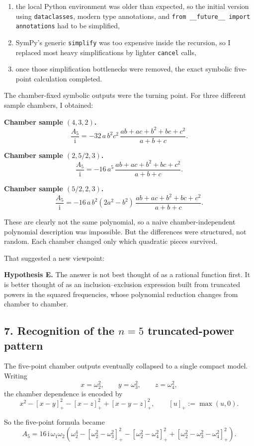 \documentclass[11pt]{article}
\newcommand{\pp}[1]{\left[#1\right]_+}
\newcommand{\ii}{\mathrm{i}}
\begin{document}
\begin{enumerate}
\item the local Python environment was older than expected, so the initial
version using \texttt{dataclasses}, modern type annotations, and
\texttt{from \_\_future\_\_ import annotations} had to be simplified,
\item SymPy's generic \texttt{simplify} was too expensive inside the recursion,
so I replaced most heavy simplifications by lighter \texttt{cancel} calls,
\item once those simplification bottlenecks were removed, the exact symbolic
five-point calculation completed.
\end{enumerate}

The chamber-fixed symbolic outputs were the turning point. For three different
sample chambers, I obtained:

\textbf{Chamber sample $(4,3,2)$.}
\[
\frac{A_5}{\ii}
=
-32\,a\,b^2 c^2\,
\frac{ab+ac+b^2+bc+c^2}{a+b+c}.
\]

\textbf{Chamber sample $(2,5/2,3)$.}
\[
\frac{A_5}{\ii}
=
-16\,a^5\,
\frac{ab+ac+b^2+bc+c^2}{a+b+c}.
\]

\textbf{Chamber sample $(5/2,2,3)$.}
\[
\frac{A_5}{\ii}
=
-16\,a\,b^2(2a^2-b^2)\,
\frac{ab+ac+b^2+bc+c^2}{a+b+c}.
\]

These are clearly not the same polynomial, so a naive chamber-independent
polynomial description was impossible. But the differences were structured, not
random. Each chamber changed only which quadratic pieces survived.

That suggested a new viewpoint:

\medskip
\textbf{Hypothesis E.} The answer is not best thought of as a rational function
first. It is better thought of as an inclusion--exclusion expression built from
truncated powers in the squared frequencies, whose polynomial reduction changes
from chamber to chamber.
\medskip

\subsection*{7. Recognition of the $n=5$ truncated-power pattern}

The five-point chamber outputs eventually collapsed to a single compact model.
Writing
\[
x=\omega_2^2,\qquad y=\omega_3^2,\qquad z=\omega_4^2,
\]
the chamber dependence is encoded by
\[
x^2-\pp{x-y}^2-\pp{x-z}^2+\pp{x-y-z}^2,
\qquad \pp{u}:=\max(u,0).
\]

So the five-point formula became
\[
A_5
=
16\,\ii\,\omega_1\omega_2
\left(
\omega_2^4
-\pp{\omega_2^2-\omega_3^2}^2
-\pp{\omega_2^2-\omega_4^2}^2
+\pp{\omega_2^2-\omega_3^2-\omega_4^2}^2
\right).
\]
\end{document}
